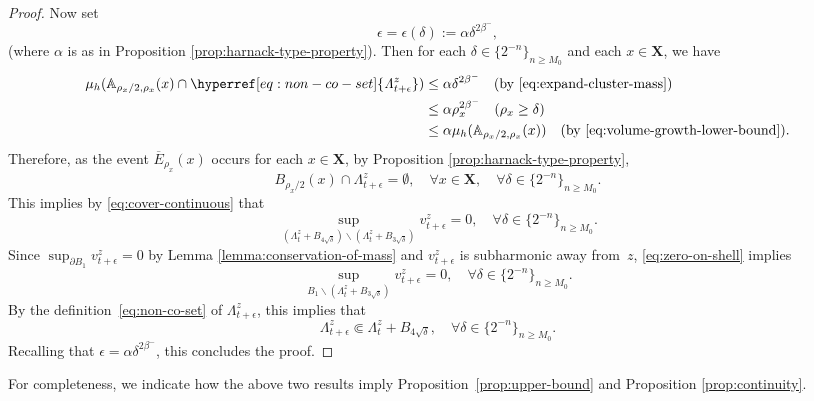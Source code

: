 \documentclass[12pt]{amsart}
\numberwithin{equation}{section}
\newcommand{\cluster}[2]{\hyperref[eq:non-co-set]{\mathit{\Lambda}^{#1}_{#2}}}
\newcommand{\odometer}[2]{\hyperref[eq:limit-odometer]{v^{#1}_{#2}}}
\begin{document}
\begin{proof}
		Now set 
		\[
		\epsilon = \epsilon(\delta) := \alpha \delta^{2 \beta^-},
		\]
		(where $\alpha$ is as in Proposition \ref{prop:harnack-type-property}). Then for each $\delta  \in \{2^{-n}\}_{n \geq M_0}$ and each $x \in \mathbf{X}$, we have
		\begin{align*}
		\mu_h(\A_{\rho_x/2,\rho_x}(x) \cap {\cluster{z}{t+\epsilon }}) &\leq \alpha \delta^{2 \beta^-} \quad \text{(by \eqref{eq:expand-cluster-mass})} \\
		&\leq \alpha \rho_x^{2 \beta^-} \quad \mbox{($\rho_x \geq \delta $)} \\
		&\leq \alpha \mu_h(\A_{\rho_x/2,\rho_x}(x)) \quad \mbox{(by \eqref{eq:volume-growth-lower-bound})}.
		\end{align*}
		Therefore, as the event $\overline E_{\rho_x }(x )$ occurs for each $x \in \mathbf{X}$, by Proposition \ref{prop:harnack-type-property},
		\[
		B_{\rho_x/2}(x ) \cap {\cluster{z}{t+\epsilon }} = \emptyset, \quad \forall x \in \mathbf{X}, \quad \forall \delta  \in \{2^{-n}\}_{n \geq M_0} .
		\]
		This implies by \eqref{eq:cover-continuous} that 
		\begin{equation} \label{eq:zero-on-shell}
		\sup_{({\cluster{z}{t}} + B_{4 \sqrt{\delta}}) \backslash ({\cluster{z}{t}} + B_{3 \sqrt{\delta}})} \odometer{z}{t+\epsilon } = 0, \quad \forall \delta  \in \{2^{-n}\}_{n \geq M_0}.
		\end{equation}
		Since $\sup_{\partial B_1} \odometer{z}{t+\epsilon } = 0$ by Lemma \ref{lemma:conservation-of-mass} and $\odometer{z}{t+\epsilon }$ is subharmonic away from~$z$, \eqref{eq:zero-on-shell} implies
		\begin{equation}
		\sup_{B_1 \backslash ({\cluster{z}{t}} + B_{3 \sqrt{\delta }})} \odometer{z}{t+\epsilon } = 0, \quad \forall \delta  \in \{2^{-n}\}_{n \geq M_0} .
		\end{equation}
		By the definition~\eqref{eq:non-co-set} of $\cluster{z}{t+\epsilon }$, this implies that
		\begin{equation}
		{\cluster{z}{t+\epsilon }} \Subset {\cluster{z}{t}} + B_{4\sqrt{\delta}}, \quad \forall \delta  \in \{2^{-n}\}_{n \geq M_0} .
		\end{equation}
		Recalling that $\epsilon = \alpha \delta^{2 \beta^-}$, this concludes the proof. 
	\end{proof}
	
	
	
	For completeness, we indicate how the above two results imply Proposition~\ref{prop:upper-bound} and Proposition \ref{prop:continuity}. 
	
\end{document}
